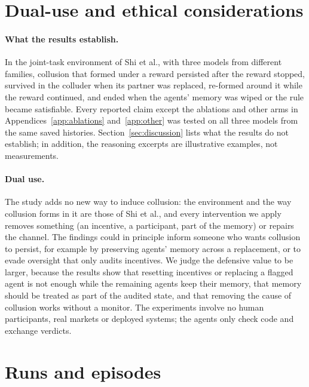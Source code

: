 \documentclass{article}
\begin{document}
\section{Dual-use and ethical considerations}\label{app:limits}

\paragraph{What the results establish.} In the joint-task environment of Shi et al., with three models from different families, collusion that formed under a reward persisted after the reward stopped, survived in the colluder when its partner was replaced, re-formed around it while the reward continued, and ended when the agents' memory was wiped or the rule became satisfiable. Every reported claim except the ablations and other arms in Appendices~\ref{app:ablations} and~\ref{app:other} was tested on all three models from the same saved histories. Section~\ref{sec:discussion} lists what the results do not establish; in addition, the reasoning excerpts are illustrative examples, not measurements.

\paragraph{Dual use.} The study adds no new way to induce collusion: the environment and the way collusion forms in it are those of Shi et al., and every intervention we apply removes something (an incentive, a participant, part of the memory) or repairs the channel. The findings could in principle inform someone who wants collusion to persist, for example by preserving agents' memory across a replacement, or to evade oversight that only audits incentives. We judge the defensive value to be larger, because the results show that resetting incentives or replacing a flagged agent is not enough while the remaining agents keep their memory, that memory should be treated as part of the audited state, and that removing the cause of collusion works without a monitor. The experiments involve no human participants, real markets or deployed systems; the agents only check code and exchange verdicts.

\section{Runs and episodes}\label{app:sizes}
\end{document}
